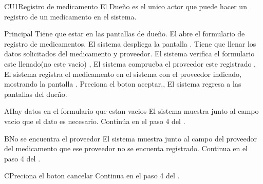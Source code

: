  \begin{UseCase}{CU1}{Registro de medicamento}{
		El Dueño es el unico actor que puede hacer un registro de un medicamento en el sistema.
	}
	\end{UseCase}
	\begin{UCtrayectoria}{Principal}
		\UCpaso[\UCactor] Tiene que estar en las pantallas de dueño.
		\UCpaso [\UCactor]El abre el formulario de registro de medicamentos. 
		\UCpaso El sistema despliega la pantalla  .%
		\UCpaso [\UCactor] Tiene que llenar los datos solicitados del medicamento y proveedor.%
		\UCpaso El sistema verifica el formulario este llenado(no este vacio) ,
		\UCpaso El sistema comprueba el proveedor este registrado ,
		\UCpaso El sistema registra el medicamento en el sistema con el proveedor indicado, mostrando la pantalla .
		\UCpaso	[\UCactor]Preciona el boton aceptar.,
		\UCpaso El sistema regresa a las pantallas del dueño.	
	\end{UCtrayectoria}

	\begin{UCtrayectoriaA}{A}{Hay datos en el formulario que estan vacios}
			\UCpaso El sistema muestra junto al campo vacio que el dato es necesario.
			\UCpaso Continúa en el paso 4 del .
		\end{UCtrayectoriaA}
		\begin{UCtrayectoriaA}{B}{No se encuentra el proveedor}
			\UCpaso El sistema muestra junto al campo del proveedor del medicamento que ese proveedor no se encuenta registrado.
			\UCpaso[] Continua en el paso 4 del .
		\end{UCtrayectoriaA}		
		\begin{UCtrayectoriaA}{C}{Preciona el boton cancelar}
			\UCpaso Continua en el paso 4 del .
		\end{UCtrayectoriaA}